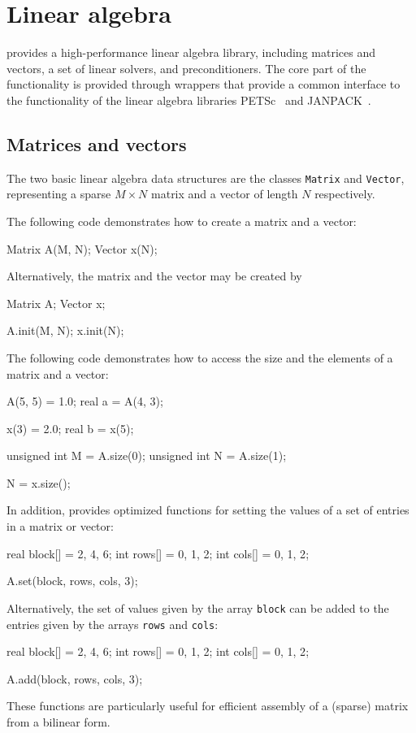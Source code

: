 \chapter{Linear algebra}


\dolfin{} provides a high-performance linear algebra library,
including matrices and vectors, a set of linear solvers,
and preconditioners. The core part of the
functionality is provided through wrappers that provide a common
interface to the functionality of the linear algebra libraries
PETSc~\cite{www:petsc} and JANPACK~\cite{www:janpack}.

\section{Matrices and vectors}

The two basic linear algebra data structures are the classes
\texttt{Matrix} and \texttt{Vector}, representing a sparse $M\times
N$ matrix and a vector of length $N$ respectively. 

The following code demonstrates how to create a matrix and a vector:
\begin{code}
Matrix A(M, N);
Vector x(N);
\end{code}
Alternatively, the matrix and the vector may be created by
\begin{code}
Matrix A;
Vector x;

A.init(M, N);
x.init(N);
\end{code}

The following code demonstrates how to access the size and the
elements of a matrix and a vector:
\begin{code}
A(5, 5) = 1.0;
real a = A(4, 3);

x(3) = 2.0;
real b = x(5);

unsigned int M = A.size(0);
unsigned int N = A.size(1);

N = x.size();
\end{code}

In addition, \dolfin{} provides optimized functions for setting the
values of a set of entries in a matrix or vector:
\begin{code}
real block[] = {2, 4, 6};
int rows[] = {0, 1, 2};
int cols[] = {0, 1, 2};
  
A.set(block, rows, cols, 3);
\end{code}
Alternatively, the set of values given by the array \texttt{block} can
be added to the entries given by the arrays \texttt{rows} and
\texttt{cols}:
\begin{code}
real block[] = {2, 4, 6};
int rows[] = {0, 1, 2};
int cols[] = {0, 1, 2};
  
A.add(block, rows, cols, 3);
\end{code}
These functions are particularly useful for efficient assembly of a (sparse)
matrix from a bilinear form.


